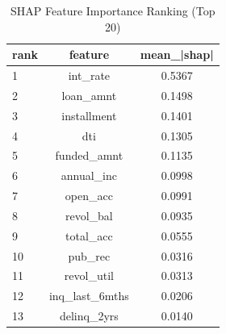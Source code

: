 \begin{table}
\centering
\caption{SHAP Feature Importance Ranking (Top 20)}
\label{tab:shap_ranking}
\begin{tabular}{lcc}
\toprule
rank & feature & mean_|shap| \\
\midrule
1 & int_rate & 0.5367 \\
2 & loan_amnt & 0.1498 \\
3 & installment & 0.1401 \\
4 & dti & 0.1305 \\
5 & funded_amnt & 0.1135 \\
6 & annual_inc & 0.0998 \\
7 & open_acc & 0.0991 \\
8 & revol_bal & 0.0935 \\
9 & total_acc & 0.0555 \\
10 & pub_rec & 0.0316 \\
11 & revol_util & 0.0313 \\
12 & inq_last_6mths & 0.0206 \\
13 & delinq_2yrs & 0.0140 \\
\bottomrule
\end{tabular}
\end{table}
